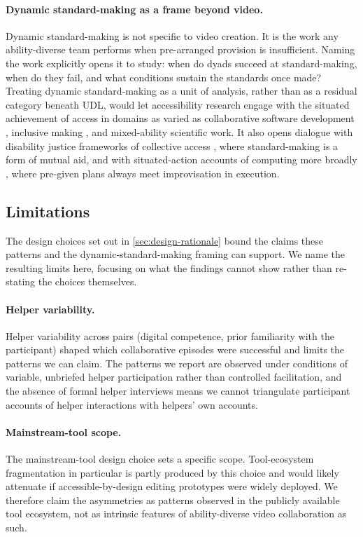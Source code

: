 \paragraph{Dynamic standard-making as a frame beyond video.}
Dynamic standard-making is not specific to video creation. It is the work any ability-diverse team performs when pre-arranged provision is insufficient. Naming the work explicitly opens it to study: when do dyads succeed at standard-making, when do they fail, and what conditions sustain the standards once made? Treating dynamic standard-making as a unit of analysis, rather than as a residual category beneath UDL, would let accessibility research engage with the situated achievement of access in domains as varied as collaborative software development \cite{das_that_2024,bandukda_context_2024}, inclusive making \cite{rocha_awareness_2025,khalaila_streetscape_2025}, and mixed-ability scientific work. It also opens dialogue with disability justice frameworks of collective access \cite{mia_mingus_access_2017}, where standard-making is a form of mutual aid, and with situated-action accounts of computing more broadly \cite{suchman_human-machine_2006}, where pre-given plans always meet improvisation in execution.

\subsection{Limitations}
\label{sec:limitations}
The design choices set out in \autoref{sec:design-rationale} bound the claims these patterns and the dynamic-standard-making framing can support. We name the resulting limits here, focusing on what the findings cannot show rather than re-stating the choices themselves.

\paragraph{Helper variability.}
Helper variability across pairs (digital competence, prior familiarity with the participant) shaped which collaborative episodes were successful and limits the patterns we can claim. The patterns we report are observed under conditions of variable, unbriefed helper participation rather than controlled facilitation, and the absence of formal helper interviews means we cannot triangulate participant accounts of helper interactions with helpers' own accounts.

\paragraph{Mainstream-tool scope.}
The mainstream-tool design choice sets a specific scope. Tool-ecosystem fragmentation in particular is partly produced by this choice and would likely attenuate if accessible-by-design editing prototypes were widely deployed. We therefore claim the asymmetries as patterns observed in the publicly available tool ecosystem, not as intrinsic features of ability-diverse video collaboration as such.

